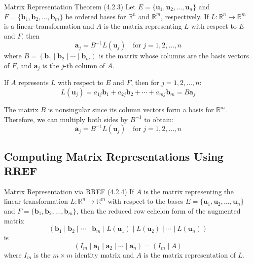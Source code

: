 \documentclass[12pt,a4paper]{article}
\newcommand{\R}{\mathbb{R}}
\newcommand{\vv}[1]{\mathbf{#1}}
\begin{document}
	\begin{theorem}{Matrix Representation Theorem (4.2.3)}
		Let $E = \{\vv{u}_1, \vv{u}_2, \ldots, \vv{u}_n\}$ and $F = \{\vv{b}_1, \vv{b}_2, \ldots, \vv{b}_m\}$ be ordered bases for $\R^n$ and $\R^m$, respectively. If $L: \R^n \to \R^m$ is a linear transformation and $A$ is the matrix representing $L$ with respect to $E$ and $F$, then
		\[
		\vv{a}_j = B^{-1} L(\vv{u}_j) \quad \text{for } j = 1, 2, \ldots, n
		\]
		where $B = (\vv{b}_1 \mid \vv{b}_2 \mid \cdots \mid \vv{b}_m)$ is the matrix whose columns are the basis vectors of $F$, and $\vv{a}_j$ is the $j$-th column of $A$.
	\end{theorem}
	
	\begin{proofbox}
		
		If $A$ represents $L$ with respect to $E$ and $F$, then for $j = 1, 2, \ldots, n$:
		\[
		L(\vv{u}_j) = a_{1j}\vv{b}_1 + a_{2j}\vv{b}_2 + \cdots + a_{mj}\vv{b}_m = B\vv{a}_j
		\]
		
		The matrix $B$ is nonsingular since its column vectors form a basis for $\R^m$. Therefore, we can multiply both sides by $B^{-1}$ to obtain:
		\[
		\vv{a}_j = B^{-1} L(\vv{u}_j) \quad \text{for } j = 1, 2, \ldots, n
		\]
		
	\end{proofbox}
	
	\subsection{Computing Matrix Representations Using RREF}
	
	\begin{corollary}{Matrix Representation via RREF (4.2.4)}
		If $A$ is the matrix representing the linear transformation $L: \R^n \to \R^m$ with respect to the bases $E = \{\vv{u}_1, \vv{u}_2, \ldots, \vv{u}_n\}$ and $F = \{\vv{b}_1, \vv{b}_2, \ldots, \vv{b}_m\}$, then the reduced row echelon form of the augmented matrix
		\[
		(\vv{b}_1 \mid \vv{b}_2 \mid \cdots \mid \vv{b}_m \mid L(\vv{u}_1) \mid L(\vv{u}_2) \mid \cdots \mid L(\vv{u}_n))
		\]
		is
		\[
		(I_m \mid \vv{a}_1 \mid \vv{a}_2 \mid \cdots \mid \vv{a}_n) = (I_m \mid A)
		\]
		where $I_m$ is the $m \times m$ identity matrix and $A$ is the matrix representation of $L$.
	\end{corollary}
	
\end{document}

